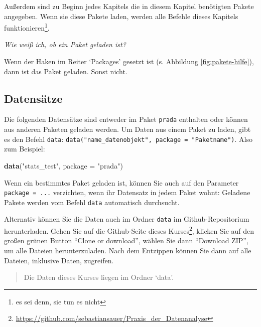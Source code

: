 \documentclass[12pt,ngerman,]{book}
\makeatletter
\newenvironment{Shaded}{\begin{snugshade}}{\end{snugshade}}
\newcommand{\KeywordTok}[1]{\textcolor[rgb]{0.13,0.29,0.53}{\textbf{#1}}}
\newcommand{\DataTypeTok}[1]{\textcolor[rgb]{0.13,0.29,0.53}{#1}}
\newcommand{\StringTok}[1]{\textcolor[rgb]{0.31,0.60,0.02}{#1}}
\newcommand{\NormalTok}[1]{#1}
\let\rmarkdownfootnote\footnote%
\def\footnote{\protect\rmarkdownfootnote}
\newenvironment{kframe}{%
\medskip{}
\setlength{\fboxsep}{.8em}
 \def\at@end@of@kframe{}%
 \ifinner\ifhmode%
  \def\at@end@of@kframe{\end{minipage}}%
  \begin{minipage}{\columnwidth}%
 \fi\fi%
 \def\FrameCommand##1{\hskip\@totalleftmargin \hskip-\fboxsep
 \colorbox{shadecolor}{##1}\hskip-\fboxsep
     \hskip-\linewidth \hskip-\@totalleftmargin \hskip\columnwidth}%
 \MakeFramed {\advance\hsize-\width
   \@totalleftmargin\z@ \linewidth\hsize
   \@setminipage}}%
 {\par\unskip\endMakeFramed%
 \at@end@of@kframe}
\renewenvironment{Shaded}{\begin{kframe}}{\end{kframe}}
\theoremstyle{definition}
\theoremstyle{definition}
\theoremstyle{remark}
\makeatother
\begin{document}
Außerdem sind zu Beginn jedes Kapitels die in diesem Kapitel benötigten
Pakete angegeben. Wenn sie diese Pakete laden, werden alle Befehle
dieses Kapitels funktionieren\footnote{es sei denn, sie tun es nicht}.

\emph{Wie weiß ich, ob ein Paket geladen ist?}

Wenn der Haken im Reiter `Packages' gesetzt ist (s. Abbildung
\ref{fig:pakete-hilfe}), dann ist das Paket geladen. Sonst nicht.

\subsection{Datensätze}\label{daten}

Die folgenden Datensätze sind entweder im Paket \texttt{prada} enthalten
oder können aus anderen Paketen geladen werden. Um Daten aus einem Paket
zu laden, gibt es den Befehl \texttt{data}:
\texttt{data("name\_datenobjekt",\ package\ =\ "Paketname")}. Also zum
Beispiel:

\begin{Shaded}
\begin{Highlighting}[]
\KeywordTok{data}\NormalTok{(}\StringTok{"stats_test"}\NormalTok{, }\DataTypeTok{package =} \StringTok{"prada"}\NormalTok{)}
\end{Highlighting}
\end{Shaded}

Wenn ein bestimmtes Paket geladen ist, können Sie auch auf den Parameter
\texttt{package\ =\ ...} verzichten, wenn ihr Datensatz in jedem Paket
wohnt: Geladene Pakete werden vom Befehl \texttt{data} automatisch
durchsucht.

Alternativ können Sie die Daten auch im Ordner \texttt{data} im
Github-Repositorium herunterladen. Gehen Sie auf die Github-Seite dieses
Kurses\footnote{\url{https://github.com/sebastiansauer/Praxis_der_Datenanalyse}},
klicken Sie auf den großen grünen Button ``Clone or download'', wählen
Sie dann ``Download ZIP'', um alle Dateien herunterzuladen. Nach dem
Entzippen können Sie dann auf alle Dateien, inklusive Daten, zugreifen.

\begin{quote}
Die Daten dieses Kurses liegen im Ordner `data'.
\end{quote}
\end{document}
